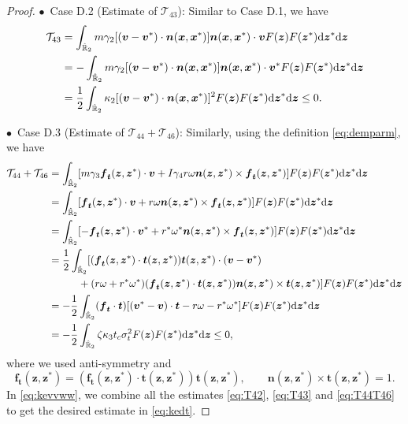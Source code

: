\documentclass[a4paper,11pt]{article}
\numberwithin{equation}{section}
\theoremstyle{definition}
\newcommand{\bfx}{\boldsymbol{x}}
\newcommand{\bfz}{\boldsymbol{z}}
\newcommand{\bfv}{\boldsymbol{v}}
\newcommand{\bfn}{\boldsymbol{n}}
\newcommand{\bft}{\boldsymbol{t}}
\newcommand{\bff}{\boldsymbol{f}}
\newcommand{\bbr}{\mathbb R}
\def\d{{  \rm d}}
\newcommand{\T}{\mathcal{T}}
\begin{document}
\begin{proof}
\noindent $\bullet$~Case D.2 (Estimate of $\T_{43}$): Similar to Case D.1, we have
\begin{align}
\begin{aligned} \label{eq:T43}
\T_{43} & = \int_{\hat{\bbr}_2} m  \gamma_2 [ (\bfv  - \bfv^*) \cdot \bfn(\bfx, \bfx^*)] \bfn(\bfx, \bfx^*)  \cdot \bfv F(\bfz) F(\bfz^*)\d\bfz^*\d\bfz \\
& = -\int_{\hat{\bbr}_2}  m \gamma_2 [ (\bfv  - \bfv^*) \cdot \bfn(\bfx, \bfx^*)] \bfn(\bfx, \bfx^*)  \cdot \bfv^* F(\bfz) F(\bfz^*)\d\bfz^*\d\bfz \\
& = \frac{1}{2}  \int_{\hat{\bbr}_2}   \kappa_2 [ (\bfv  - \bfv^*) \cdot \bfn(\bfx, \bfx^*)]^2  F(\bfz) F(\bfz^*)\d\bfz^*\d\bfz\le 0. \\
\end{aligned}
\end{align}

\noindent $\bullet$~Case D.3 (Estimate of $\T_{44}+\T_{46}$): Similarly, using the definition \eqref{eq:demparm}, we have
\begin{align}
\begin{aligned} \label{eq:T44T46}
\T_{44} + \T_{46}
& = \int_{\hat{\bbr}_2}   [m\gamma_3\bff_{\bft}(\bfz,\bfz^*) \cdot \bfv + I\gamma_4  r \omega\bfn (\bfz,\bfz^*)\times \bff_{\bft}(\bfz,\bfz^*)  ] F(\bfz)  F(\bfz^*)\d\bfz^*\d\bfz \\
& = \int_{\hat{\bbr}_2}  [\bff_{\bft}(\bfz,\bfz^*) \cdot \bfv +  r \omega\bfn (\bfz,\bfz^*)\times \bff_{\bft}(\bfz,\bfz^*)  ] F(\bfz)  F(\bfz^*)\d\bfz^*\d\bfz \\
& = \int_{\hat{\bbr}_2}   [-\bff_{\bft}(\bfz,\bfz^*) \cdot \bfv^* +   r^* \omega^*\bfn (\bfz,\bfz^*)\times \bff_{\bft}(\bfz,\bfz^*)  ] F(\bfz)  F(\bfz^*)\d\bfz^*\d\bfz \\
& = \frac12\int_{\hat{\bbr}_2}   [(\bff_{\bft}(\bfz,\bfz^*) \cdot\bft(\bfz,\bfz^*)) \bft(\bfz,\bfz^*)\cdot (\bfv-\bfv^*)\\
&\hspace{1cm}+   (r \omega+r^*\omega^*)(\bff_{\bft}(\bfz,\bfz^*) \cdot\bft(\bfz,\bfz^*))\bfn (\bfz,\bfz^*)\times \bft(\bfz,\bfz^*) ] F(\bfz)  F(\bfz^*)\d\bfz^*\d\bfz \\
& =-\frac12 \int_{\hat{\bbr}_2}  (\bff_{\bft} \cdot \bft)[(\bfv^* - \bfv)\cdot \bft - r\omega -r^*\omega^*]  F(\bfz)  F(\bfz^*)\d\bfz^*\d\bfz\\
& =-\frac12 \int_{\hat{\bbr}_2}  \zeta\kappa_3t_c \sigma_t^2 F(\bfz)  F(\bfz^*)\d\bfz^*\d\bfz\le 0,
\end{aligned}
\end{align}
where we used anti-symmetry and
\[
\bff_{\bft}(\bfz,\bfz^*) = (\bff_{\bft}(\bfz,\bfz^*) \cdot\bft(\bfz,\bfz^*)) \bft(\bfz,\bfz^*),\qquad \bfn (\bfz,\bfz^*)\times \bft(\bfz,\bfz^*)=1.
\]
In \eqref{eq:kevvww}, we combine all the estimates \eqref{eq:T42}, \eqref{eq:T43} and \eqref{eq:T44T46}  to get the desired estimate in \eqref{eq:kedt}. 
\end{proof}
\end{document}
